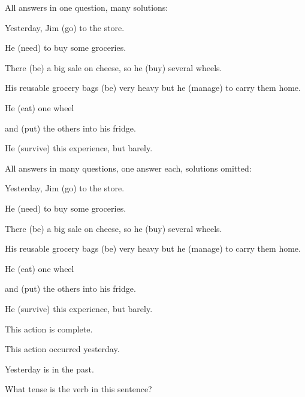 \documentclass{ximera}
\begin{document}
\begin{question}
\begin{solution}

All answers in one question, many solutions:

Yesterday, Jim  (go) to the store.\end{solution}\begin{solution} He  (need) to buy some groceries.\end{solution}\begin{solution} There  (be) a big sale on cheese, so he  (buy) several wheels.\end{solution}\begin{solution} His reusable grocery bags  (be) very heavy but he  (manage) to carry them home.\end{solution}\begin{solution} He  (eat) one wheel\end{solution}\begin{solution} and  (put) the others into his fridge.\end{solution}\begin{solution} He  (survive) this experience, but barely.

\end{solution}
\end{question}

\begin{question}

All answers in many questions, one answer each, solutions omitted:

Yesterday, Jim  (go) to the store.\end{question}\begin{question} He  (need) to buy some groceries.\end{question}\begin{question} There  (be) a big sale on cheese, so he  (buy) several wheels.\end{question}\begin{question} His reusable grocery bags  (be) very heavy but he  (manage) to carry them home.\end{question}\begin{question} He  (eat) one wheel\end{question}\begin{question} and  (put) the others into his fridge.\end{question} \begin{question} He  (survive) this experience, but barely.

\end{question}

\begin{question}
\begin{solution}
\begin{hint}
This action is complete.
\end{hint}
\begin{hint}
This action occurred yesterday.
\end{hint}
\begin{hint}
Yesterday is in the past.
\end{hint}
What tense is the verb in this sentence?
\end{solution}
\end{question}
\end{document}
